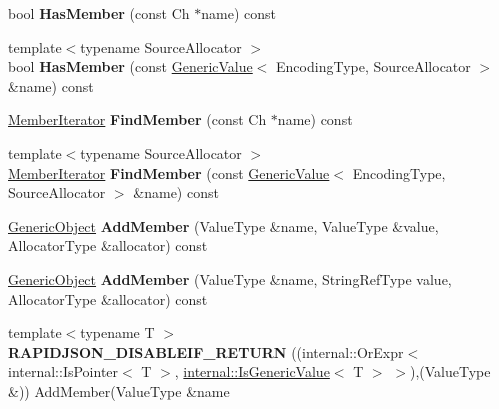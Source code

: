 \begin{DoxyCompactItemize}
\item 
bool {\bfseries Has\+Member} (const Ch $\ast$name) const \hypertarget{a00120_a545cbb3d1e99a48fd7a40ebeac1d10da}{}\label{a00120_a545cbb3d1e99a48fd7a40ebeac1d10da}

\item 
{\footnotesize template$<$typename Source\+Allocator $>$ }\\bool {\bfseries Has\+Member} (const \hyperlink{a00130}{Generic\+Value}$<$ Encoding\+Type, Source\+Allocator $>$ \&name) const \hypertarget{a00120_a946712fa1b4fc9ab551a63d17d671f47}{}\label{a00120_a946712fa1b4fc9ab551a63d17d671f47}

\item 
\hyperlink{a00118}{Member\+Iterator} {\bfseries Find\+Member} (const Ch $\ast$name) const \hypertarget{a00120_a6713425c66b7f05e4ac5d251a8f5b708}{}\label{a00120_a6713425c66b7f05e4ac5d251a8f5b708}

\item 
{\footnotesize template$<$typename Source\+Allocator $>$ }\\\hyperlink{a00118}{Member\+Iterator} {\bfseries Find\+Member} (const \hyperlink{a00130}{Generic\+Value}$<$ Encoding\+Type, Source\+Allocator $>$ \&name) const \hypertarget{a00120_a3eca7c61d4d2b728de83ffdb1f35e45a}{}\label{a00120_a3eca7c61d4d2b728de83ffdb1f35e45a}

\item 
\hyperlink{a00120}{Generic\+Object} {\bfseries Add\+Member} (Value\+Type \&name, Value\+Type \&value, Allocator\+Type \&allocator) const \hypertarget{a00120_a59554f8232c7c2a74d8043f4b4b20ec2}{}\label{a00120_a59554f8232c7c2a74d8043f4b4b20ec2}

\item 
\hyperlink{a00120}{Generic\+Object} {\bfseries Add\+Member} (Value\+Type \&name, String\+Ref\+Type value, Allocator\+Type \&allocator) const \hypertarget{a00120_a33df672a1ecafa47c2d7ed3c765738c1}{}\label{a00120_a33df672a1ecafa47c2d7ed3c765738c1}

\item 
{\footnotesize template$<$typename T $>$ }\\{\bfseries R\+A\+P\+I\+D\+J\+S\+O\+N\+\_\+\+D\+I\+S\+A\+B\+L\+E\+I\+F\+\_\+\+R\+E\+T\+U\+RN} ((internal\+::\+Or\+Expr$<$ internal\+::\+Is\+Pointer$<$ T $>$, \hyperlink{a00184}{internal\+::\+Is\+Generic\+Value}$<$ T $>$ $>$),(Value\+Type \&)) Add\+Member(Value\+Type \&name\hypertarget{a00120_a98ebcec632c41442d89cd8634b7ecc47}{}\label{a00120_a98ebcec632c41442d89cd8634b7ecc47}


\end{DoxyCompactItemize}
